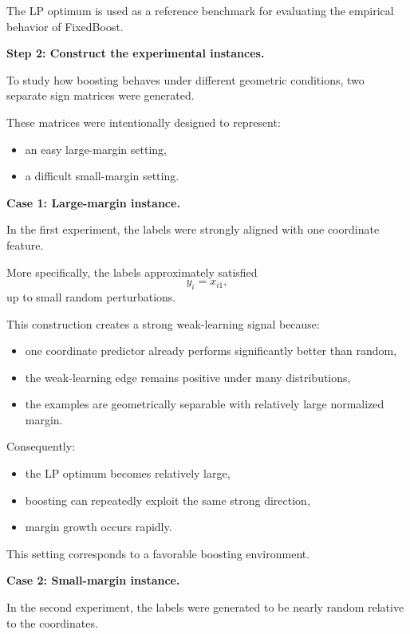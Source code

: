 \documentclass[11pt]{article}
\begin{document}
\begin{enumerate}
\begin{solutionbox}
The LP optimum is used as a reference benchmark for evaluating the empirical behavior of FixedBoost.

\medskip

\textbf{Step 2: Construct the experimental instances.}

To study how boosting behaves under different geometric conditions, two separate sign matrices were generated.

These matrices were intentionally designed to represent:
\begin{itemize}
    \item an easy large-margin setting,
    \item a difficult small-margin setting.
\end{itemize}

\medskip

\textbf{Case 1: Large-margin instance.}

In the first experiment, the labels were strongly aligned with one coordinate feature.

More specifically, the labels approximately satisfied
\[
y_i=x_{i1},
\]
up to small random perturbations.

This construction creates a strong weak-learning signal because:
\begin{itemize}
    \item one coordinate predictor already performs significantly better than random,
    \item the weak-learning edge remains positive under many distributions,
    \item the examples are geometrically separable with relatively large normalized margin.
\end{itemize}

Consequently:
\begin{itemize}
    \item the LP optimum becomes relatively large,
    \item boosting can repeatedly exploit the same strong direction,
    \item margin growth occurs rapidly.
\end{itemize}

This setting corresponds to a favorable boosting environment.

\medskip

\textbf{Case 2: Small-margin instance.}

In the second experiment, the labels were generated to be nearly random relative to the coordinates.


\end{solutionbox}
\end{enumerate}
\end{document}

